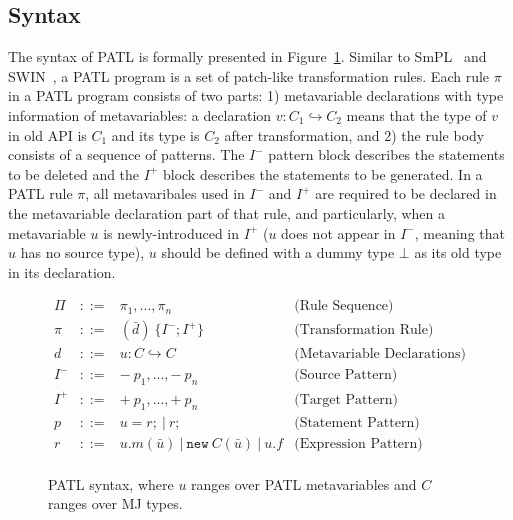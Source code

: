 \documentclass[a4paper, USenglish]{lipics-v2016}
\newenvironment{smpage}[1]
{\begin{lrbox}{\fmbox}\begin{minipage}{#1}}
{\end{minipage}\end{lrbox}\usebox{\fmbox}}
\newcommand{\PATL}{PATL\xspace}
\theoremstyle{plain}
\begin{document}
\subsection{Syntax} 

The syntax of \PATL is formally presented in Figure~\ref{fg-syntax}.
Similar to SmPL~\cite{DBLP:conf/eurosys/PadioleauLHM08} and
SWIN~\cite{Li:2015:STT:2678015.2682534}, a \PATL program is a set of
patch-like transformation rules. Each rule $\pi$ in a \PATL program
consists of two parts: 1) metavariable declarations with type
information of metavariables: a declaration $v:C_1\hookrightarrow C_2$ means that the type of $v$ in old API is $C_1$ and its type is $C_2$ after transformation, and 2) the rule body consists 
of a sequence of patterns. The $I^-$ pattern block describes the
statements to be deleted and the $I^+$ block describes the statements
to be generated. In a \PATL rule $\pi$, all metavaribales used in
$I^-$ and $I^+$ are required to be declared in the metavariable
declaration part of that rule, and particularly, when a metavariable
$u$ is newly-introduced in $I^+$ ($u$ does not appear in $I^-$,
meaning that $u$ has no source type), $u$ should be defined with a
dummy type $\bot$ as its old type in its declaration.

\begin{figure}[ht]
\begin{center}
\begin{smpage}{0.7\columnwidth}
\footnotesize
\[
\begin{array}{ccllcccc}
   \Pi  &::=&   \pi_1,...,\pi_n & \text{(Rule Sequence)}\\
   \pi  &::=&   (\bar{d})~\{I^{-};I^{+}\} & \text{(Transformation Rule)}\\
   d    &::=& u:C\hookrightarrow C & \text{(Metavariable Declarations)}\\
   I^{-}&::=&   \mathit{-~p_1},...,\mathit{-~p_n}& \text{(Source Pattern)}\\
   I^{+}&::=&   \mathit{+~p_1},...,\mathit{+~p_n}   & \text{(Target Pattern)}\\
   p  &::=&   u = r; ~|~ r;  & \text{(Statement Pattern)}\\
   r  &::=& u.m(\bar{u}) ~|~ \mathtt{new}~C(\bar{u}) ~|~ u.f & \text{(Expression Pattern)}\\
\end{array}
\]
\end{smpage}
\end{center}
\vspace{-10pt}
\caption{\PATL syntax, where $u$ ranges over \PATL metavariables and $C$ ranges over MJ types.}
\label{fg-syntax}
\end{figure}
\end{document}
